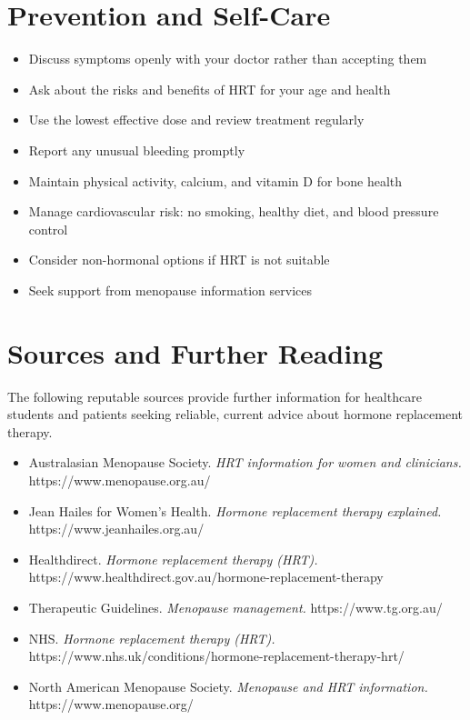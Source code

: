 \section*{Prevention and Self-Care}
\begin{itemize}
    \item Discuss symptoms openly with your doctor rather than accepting them
    \item Ask about the risks and benefits of HRT for your age and health
    \item Use the lowest effective dose and review treatment regularly
    \item Report any unusual bleeding promptly
    \item Maintain physical activity, calcium, and vitamin D for bone health
    \item Manage cardiovascular risk: no smoking, healthy diet, and blood pressure control
    \item Consider non-hormonal options if HRT is not suitable
    \item Seek support from menopause information services
\end{itemize}

\section*{Sources and Further Reading}
The following reputable sources provide further information for healthcare students and patients seeking reliable, current advice about hormone replacement therapy.

\begin{itemize}
    \item Australasian Menopause Society. \textit{HRT information for women and clinicians.} https://www.menopause.org.au/
    \item Jean Hailes for Women's Health. \textit{Hormone replacement therapy explained.} https://www.jeanhailes.org.au/
    \item Healthdirect. \textit{Hormone replacement therapy (HRT).} https://www.healthdirect.gov.au/hormone-replacement-therapy
    \item Therapeutic Guidelines. \textit{Menopause management.} https://www.tg.org.au/
    \item NHS. \textit{Hormone replacement therapy (HRT).} https://www.nhs.uk/conditions/hormone-replacement-therapy-hrt/
    \item North American Menopause Society. \textit{Menopause and HRT information.} https://www.menopause.org/
\end{itemize}
